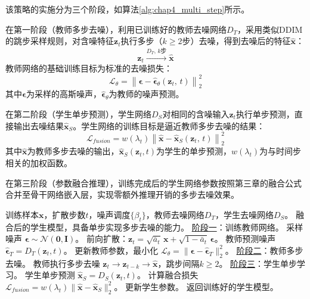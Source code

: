 该策略的实施分为三个阶段，如算法\ref{alg:chap4_multi_step}所示。

在第一阶段（教师多步去噪），利用已训练好的教师去噪网络$D_T$，采用类似DDIM\cite{song2020denoising}的跳步采样规则，对含噪特征$\mathbf{z}_t$执行多步（$k \geq 2$步）去噪，得到去噪后的特征$\hat{\mathbf{x}}$：
\begin{equation}
\mathbf{z}_t \xrightarrow{D_T,\,k\text{步}} \hat{\mathbf{x}}
\label{eq:chap4_teacher_multistep}
\end{equation}
教师网络的基础训练目标为标准的去噪损失：
\begin{equation}
\mathcal{L}_{\theta} = \left\|\boldsymbol{\epsilon} - \hat{\boldsymbol{\epsilon}}_\theta(\mathbf{z}_t,\, t)\right\|_2^2
\label{eq:chap4_teacher_base}
\end{equation}
其中$\boldsymbol{\epsilon}$为采样的高斯噪声，$\hat{\boldsymbol{\epsilon}}_\theta$为教师的噪声预测。

在第二阶段（学生单步预测），学生网络$D_S$对相同的含噪输入$\mathbf{z}_t$执行单步预测，直接输出去噪结果$\hat{\mathbf{x}}_S$。学生网络的训练目标是逼近教师多步去噪的结果：
\begin{equation}
\mathcal{L}_{fusion} = w(\lambda_t)\left\|\hat{\mathbf{x}} - \hat{\mathbf{x}}_S(\mathbf{z}_t,\, t)\right\|_2^2
\label{eq:chap4_fusion_loss}
\end{equation}
其中$\hat{\mathbf{x}}$为教师多步去噪的输出，$\hat{\mathbf{x}}_S(\mathbf{z}_t, t)$为学生的单步预测，$w(\lambda_t)$为与时间步相关的加权函数。

在第三阶段（参数融合推理），训练完成后的学生网络参数按照第三章的融合公式合并至骨干网络嵌入层，实现零额外推理开销的多步去噪效果。

\begin{algorithm}[htbp]
\caption{多步去噪融合算法}
\label{alg:chap4_multi_step}
\begin{algorithmic}[1]
\REQUIRE 训练样本$\mathbf{x}$，扩散步数$t$，噪声调度$\{\beta_t\}$，教师去噪网络$D_T$，学生去噪网络$D_S$。
\ENSURE 融合后的学生模型，具备单步实现多步去噪的能力。
\STATE \underline{阶段一}：训练教师网络。
\STATE 采样噪声 $\boldsymbol{\epsilon} \sim \mathcal{N}(\mathbf{0}, \mathbf{I})$。
\STATE 前向扩散：$\mathbf{z}_t = \sqrt{\bar{a}_t}\,\mathbf{x} + \sqrt{1-\bar{a}_t}\,\boldsymbol{\epsilon}$。
\STATE 教师预测噪声 $\hat{\boldsymbol{\epsilon}}_T = D_T(\mathbf{z}_t, t)$。
\STATE 更新教师参数，最小化 $\mathcal{L}_\theta = \|\boldsymbol{\epsilon} - \hat{\boldsymbol{\epsilon}}_T\|_2^2$。
\ENDFOR
\STATE \underline{阶段二}：教师多步去噪。
\STATE 教师执行多步去噪 $\mathbf{z}_t \rightarrow \mathbf{z}_{t-k} \rightarrow \hat{\mathbf{x}}$，跳步间隔$k \geq 2$。
\ENDFOR
\STATE \underline{阶段三}：学生单步学习。
\STATE 学生单步预测 $\hat{\mathbf{x}}_S = D_S(\mathbf{z}_t, t)$。
\STATE 计算融合损失 $\mathcal{L}_{fusion} = w(\lambda_t)\|\hat{\mathbf{x}} - \hat{\mathbf{x}}_S\|_2^2$。
\STATE 更新学生参数。
\ENDFOR
\STATE 返回训练好的学生模型。
\end{algorithmic}
\end{algorithm}

